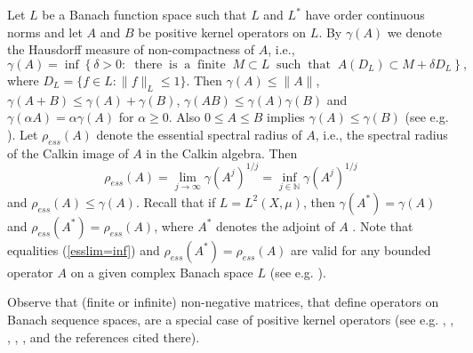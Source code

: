 \documentclass[12pt, reqno]{amsart}
\theoremstyle{definition}
\theoremstyle{remark}
\numberwithin{equation}{section}
\newcommand{\be}{\begin{equation}}
\newcommand{\ee}{\end{equation}}
\newcommand{\NN}{\mathbb{N}}
\begin{document}
Let $L$ be a Banach function space such that $L$ and $L^*$ have order
continuous norms and let $A$ and $B$ be  positive kernel operators on $L$. By $\gamma (A)$ we denote the Hausdorff measure of
non-compactness of $A$, i.e.,
$$\gamma (A) = \inf\left\{ \delta >0 : \;\; \mathrm{there}\;\; \mathrm{is} \;\; \mathrm{a}\;\; \mathrm{finite}\;\; M \subset L \;\;\mathrm{such} \;\; \mathrm{that} \;\; A(D_L) \subset M + \delta D_L  \right\},$$
where $D_L =\{f\in L : \|f\|_L \le 1\}$. Then $\gamma (A) \le \|A\|$, $\gamma (A+B) \le \gamma (A) + \gamma (B)$, $\gamma(AB) \le \gamma (A)\gamma (B)$ and $\gamma (\alpha A) =\alpha \gamma (A)$ for $\alpha \ge 0$. Also
$0 \le A\le B$  implies $\gamma (A) \le \gamma (B)$ (see e.g. \cite[Corollary 4.3.7 and Corollary 3.7.3]{Me91}). Let $\rho _{ess} (A)$ denote the essential spectral radius of $A$, i.e., the spectral radius of the Calkin image of $A$ in the Calkin algebra. Then
\be
 \rho _{ess} (A) =\lim _{j \to \infty} \gamma (A^j)^{1/j}=\inf _{j \in \NN} \gamma (A^j)^{1/j}
\label{esslim=inf}
\ee
and $\rho _{ess} (A) \le \gamma (A)$. Recall that if $L=L^2(X, \mu)$, then $\gamma (A^*) = \gamma (A)$ and $\rho _{ess} (A^*)=\rho _{ess} (A)  $, where $A^*$ denotes the adjoint of $A$ . Note that equalities (\ref{esslim=inf}) and  $\rho _{ess} (A^*)=\rho _{ess} (A)  $ are valid for any bounded operator $A$ on a given complex Banach space $L$ (see e.g. \cite[Theorem 4.3.13 and Proposition 4.3.11]{Me91}).


Observe that (finite or infinite) non-negative matrices, that define operators on Banach sequence spaces, are a special case of positive kernel operators
(see e.g. \cite{P12}, \cite{DP16}, \cite{DP10}, \cite{P11}, \cite{BP21}, and the references cited there).
\end{document}
